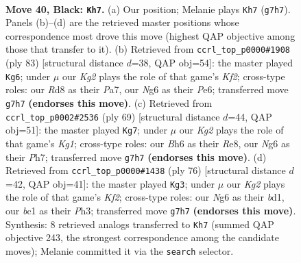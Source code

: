\documentclass[11pt]{article}
\begin{document}
\clearpage

\begin{figure}[p]\centering
\begin{subfigure}{0.46\textwidth}\centering
\resizebox{\linewidth}{!}{%
\newchessgame
\chessboard[
  setfen={3r4/p5k1/Pp4nb/5p2/2B1pP2/6K1/8/1RB5 b - - 13 40},
  showmover=false,
  pgfstyle=straightmove, color=movearrow, markmove={g7-h7}
]}
\caption{}
\end{subfigure}\hfill
\begin{subfigure}{0.46\textwidth}\centering
\resizebox{\linewidth}{!}{%
\newchessgame
\chessboard[
  setfen={7R/p4k2/1b2p3/1b1pB1pp/3P4/1P2K3/8/8 b - - 1 42},
  showmover=false,
  pgfstyle=straightmove, color=movearrow, markmove={f7-g6}
]}
\caption{}
\end{subfigure}
\\[4pt]
\begin{subfigure}{0.46\textwidth}\centering
\resizebox{\linewidth}{!}{%
\newchessgame
\chessboard[
  setfen={4r1k1/1b5p/1b4p1/1p1P4/1Pp1B2P/6K1/4R3/1R6 b - - 0 35},
  showmover=false,
  pgfstyle=straightmove, color=movearrow, markmove={g8-g7}
]}
\caption{}
\end{subfigure}\hfill
\begin{subfigure}{0.46\textwidth}\centering
\resizebox{\linewidth}{!}{%
\newchessgame
\chessboard[
  setfen={6k1/2R3p1/7p/3r1P2/p5P1/4B2P/5K2/3b4 w - - 2 39},
  showmover=false,
  pgfstyle=straightmove, color=movearrow, markmove={f2-g3}
]}
\caption{}
\end{subfigure}
\caption{\textbf{Move 40, Black: \texttt{Kh7}.} (a) Our position; Melanie plays \texttt{Kh7} (\texttt{g7h7}). Panels (b)--(d) are the retrieved master positions whose correspondence most drove this move (highest QAP objective among those that transfer to it). (b) Retrieved from \texttt{ccrl\_top\_p0000\#1908} (ply 83) [structural distance $d$=38, QAP obj=54]: the master played \texttt{Kg6}; under $\mu$ our \emph{Kg2} plays the role of that game's \emph{Kf2}; cross-type roles: our \emph{R}d8 as their \emph{P}a7, our \emph{N}g6 as their \emph{P}e6; transferred move \texttt{g7h7} \textbf{(endorses this move)}. (c) Retrieved from \texttt{ccrl\_top\_p0002\#2536} (ply 69) [structural distance $d$=44, QAP obj=51]: the master played \texttt{Kg7}; under $\mu$ our \emph{Kg2} plays the role of that game's \emph{Kg1}; cross-type roles: our \emph{B}h6 as their \emph{R}e8, our \emph{N}g6 as their \emph{P}h7; transferred move \texttt{g7h7} \textbf{(endorses this move)}. (d) Retrieved from \texttt{ccrl\_top\_p0000\#1438} (ply 76) [structural distance $d$=42, QAP obj=41]: the master played \texttt{Kg3}; under $\mu$ our \emph{Kg2} plays the role of that game's \emph{Kf2}; cross-type roles: our \emph{N}g6 as their \emph{b}d1, our \emph{b}c1 as their \emph{P}h3; transferred move \texttt{g7h7} \textbf{(endorses this move)}. Synthesis: 8 retrieved analogs transferred to \texttt{Kh7} (summed QAP objective 243, the strongest correspondence among the candidate moves); Melanie committed it via the \texttt{search} selector.}
\label{fig:thought-m79}
\end{figure}
\end{document}
